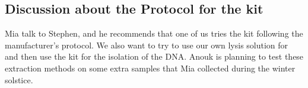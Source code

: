 \subsection{Discussion about the Protocol for the kit}
\label{task:20170123_cj2}

Mia talk to Stephen, and he recommends that one of us tries the kit following the manufacturer's protocol. We also want to try to use our own lysis solution for and then use the kit for the isolation of the DNA. Anouk is planning to test these extraction methods on some extra samples that Mia collected during the winter solstice.

